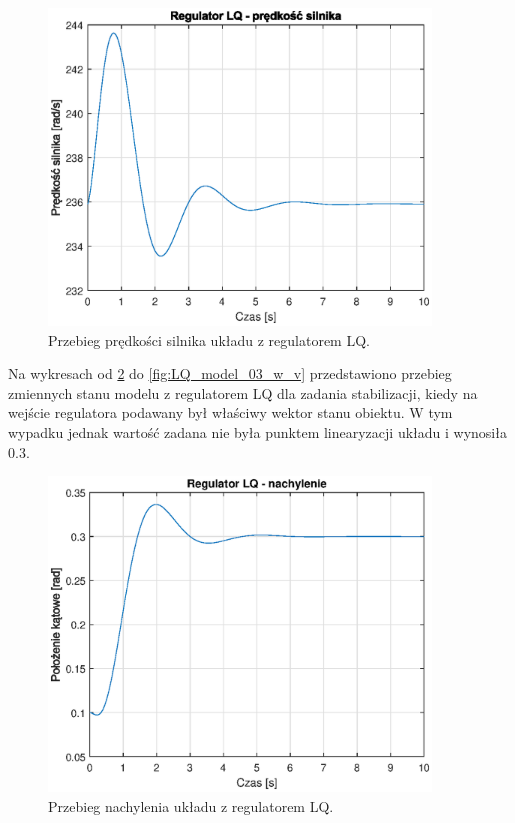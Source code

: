 \documentclass[11pt,a4paper]{article}
\begin{document}
\begin{figure}[H]
	\centering
	\includegraphics[width=4in]{Figures/LQ_model_w_v.eps}
	\caption{Przebieg prędkości silnika układu z regulatorem LQ.}
	\label{fig:LQ_model_w_v}
\end{figure}

Na wykresach od \ref{fig:LQ_model_03_alpha_v} do \ref{fig:LQ_model_03_w_v} przedstawiono przebieg zmiennych stanu modelu z regulatorem LQ dla zadania stabilizacji, kiedy na wejście regulatora podawany był właściwy wektor stanu obiektu. W tym wypadku jednak wartość zadana nie była punktem linearyzacji układu i wynosiła 0.3.

\begin{figure}[H]
	\centering
	\includegraphics[width=4in]{Figures/LQ_model_03_alpha_v.eps}
	\caption{Przebieg nachylenia układu z regulatorem LQ.}
	\label{fig:LQ_model_03_alpha_v}
\end{figure}
\end{document}
